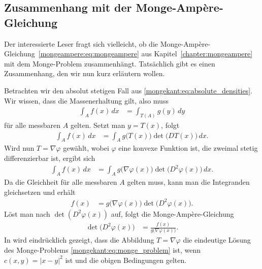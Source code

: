 \subsection{Zusammenhang mit der Monge-Ampère-Gleichung}
Der interessierte Leser fragt sich vielleicht,
ob die Monge-Ampère-Gleichung~\eqref{mongeampere:eq:mongeampere}
aus Kapitel~\ref{chapter:mongeampere}
mit dem Monge-Problem zusammenhängt.
Tatsächlich gibt es einen Zusammenhang,
den wir nun kurz erläutern wollen.

Betrachten wir den absolut stetigen Fall aus \eqref{mongekant:eq:absolute_densities}.
Wir wissen,
dass die Massenerhaltung gilt,
also muss
\begin{align*}
\int_{A} f(x) \, dx
&=
\int_{T(A)} g(y) \, dy
\end{align*}
für alle messbaren $A$ gelten.
Setzt man $y = T(x)$,
folgt
\begin{align*}
\int_{A} f(x) \, dx
&=
\int_{A} g \bigl(T(x)\bigr) \det \bigl(DT(x)\bigr) \, dx
.
\end{align*}
Wird nun $T = \nabla \varphi$ gewählt,
wobei $\varphi$ eine konvexe Funktion ist,
die zweimal stetig differenzierbar ist,
ergibt sich
\begin{align*}
\int_{A} f(x) \, dx
&=
\int_{A} g\bigl(\nabla \varphi(x)\bigr) \det\bigl(D^2 \varphi(x)\bigr) \, dx
.
\end{align*}
Da die Gleichheit für alle messbaren $A$ gelten muss,
kann man die Integranden gleichsetzen und erhält
\begin{align*}
f(x)
&=
g\bigl(\nabla \varphi(x)\bigr) \det\bigl(D^2 \varphi(x)\bigr)
.
\end{align*}
Löst man nach $\det(D^2 \varphi(x))$ auf,
folgt die Monge-Ampère-Gleichung
%
\begin{align*}
\det\bigl(D^2 \varphi(x)\bigr)
&=
\frac{f(x)}{g\bigl(\nabla \varphi(x)\bigr)}
.
\end{align*}
In \cite{mongekant:brenier} wird eindrücklich gezeigt,
dass die Abbildung $T = \nabla \varphi$
die eindeutige Lösung des Monge-Problems \eqref{mongekant:eq:monge_problem} ist,
wenn $c(x,y) = \left\lvert x - y\right\rvert^2$ ist und die obigen Bedingungen gelten.

